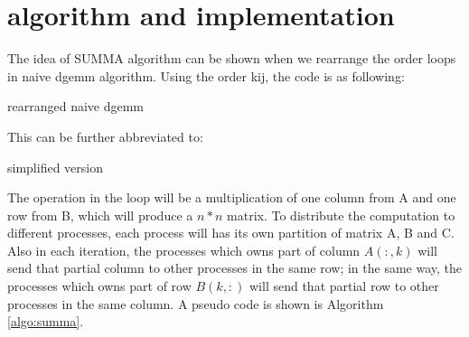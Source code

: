 \documentclass{ics-paper}
\begin{document}
\section{algorithm and implementation}
The idea of SUMMA algorithm can be shown when we rearrange the order loops in
naive dgemm algorithm. Using the order kij, the code is as following:
\begin{algorithm}
	\caption{rearranged naive dgemm}
\end{algorithm}

This can be further abbreviated to: 
\begin{algorithm}
	\caption{simplified version}
\end{algorithm}

The operation in the loop will be a multiplication of one column from A and one row from B, which will produce a $n*n$ matrix. To distribute the computation to different processes, each process will has its own partition of matrix A, B and C. Also in each iteration, the processes which owns part of column $A(:,k)$ will send that partial column to other processes in the same row; in the same way, the processes which owns part of row $B(k,:)$ will send that partial row to other processes in the same column. A pseudo code is shown is Algorithm \ref{algo:summa}.
\end{document}
